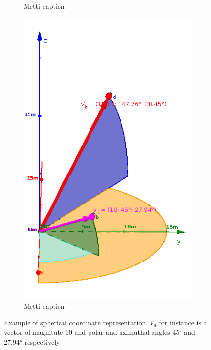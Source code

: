 \begin{figure}
\begin{subfigure}{1.0\textwidth}
		\caption{Metti caption}
	\end{subfigure}		
	\endminipage\hfil
	\begin{subfigure}{1.0\textwidth}
		\includegraphics[width=\linewidth]{./images/birdflocking/vertical}
	
		\caption{Metti caption}
	\end{subfigure}
	\endminipage
	\caption{Example of spherical coordinate representation. $V_d$ for
		instance is a vector of magnitute 10 and polar and aximuthal
		angles 45° and 27.94° respectively.}
\end{figure}


